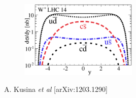 \documentclass[10pt]{beamer}
\begin{document}
\begin{frame}
\begin{columns}
\begin{column}{0.5\textwidth}
\begin{figure}[b!]
\begin{center}
       \includegraphics[width=0.5\textwidth]{WpLHC14.eps}\\
    \end{center}
    \vskip-0.5cm
    \label{fig:pdf-jets}
\end{figure}

{ \footnotesize \hfill A. Kusina \emph{et al} [arXiv:1203.1290] }

\end{column}

\end{columns}

\end{frame}
\end{document}
